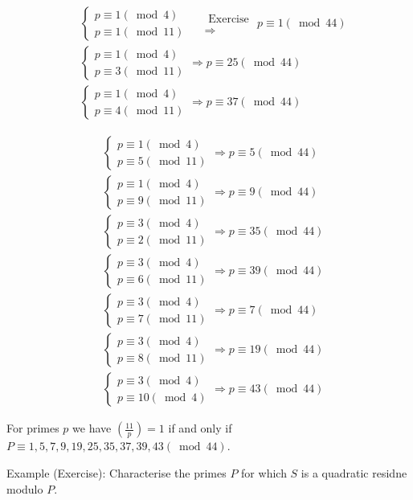 \documentclass[10pt]{article}
\begin{document}
$$
\begin{aligned}
& \left\{\begin{array}{l}
p \equiv 1(\bmod 4) \\
p \equiv 1(\bmod 11)
\end{array} \quad \begin{array}{l}
\text { Exercise } \\
\Rightarrow
\end{array} p \equiv 1(\bmod 44)\right. \\
& \left\{\begin{array}{l}
p \equiv 1(\bmod 4) \\
p \equiv 3(\bmod 11)
\end{array} \Rightarrow p \equiv 25(\bmod 44)\right. \\
& \left\{\begin{array}{l}
p \equiv 1(\bmod 4) \\
p \equiv 4(\bmod 11)
\end{array} \Rightarrow p \equiv 37(\bmod 44)\right.
\end{aligned}
$$

$$
\begin{aligned}
& \left\{\begin{array}{l}
p \equiv 1(\bmod 4) \\
p \equiv 5(\bmod 11)
\end{array} \Rightarrow p \equiv 5(\bmod 44)\right. \\
& \left\{\begin{array}{l}
p \equiv 1(\bmod 4) \\
p \equiv 9(\bmod 11)
\end{array} \Rightarrow p \equiv 9(\bmod 44)\right. \\
& \left\{\begin{array}{l}
p \equiv 3(\bmod 4) \\
p \equiv 2(\bmod 11)
\end{array} \Rightarrow p \equiv 35(\bmod 44)\right. \\
& \left\{\begin{array}{l}
p \equiv 3(\bmod 4) \\
p \equiv 6(\bmod 11)
\end{array} \Rightarrow p \equiv 39(\bmod 44)\right. \\
& \left\{\begin{array}{l}
p \equiv 3(\bmod 4) \\
p \equiv 7(\bmod 11)
\end{array} \Rightarrow p \equiv 7(\bmod 44)\right. \\
& \left\{\begin{array}{l}
p \equiv 3(\bmod 4) \\
p \equiv 8(\bmod 11)
\end{array} \Rightarrow p \equiv 19(\bmod 44)\right. \\
& \left\{\begin{array}{l}
p \equiv 3(\bmod 4) \\
p \equiv 10(\bmod 4)
\end{array} \Rightarrow p \equiv 43(\bmod 44)\right.
\end{aligned}
$$

For primes $p$ we have $\left(\frac{11}{p}\right)=1$ if and only if $P \equiv 1,5,7,9,19,25,35,37,39,43(\bmod 44)$.

Example (Exercise): Characterise the primes $P$ for which $S$ is a quadratic residne modulo $P$.
\end{document}

